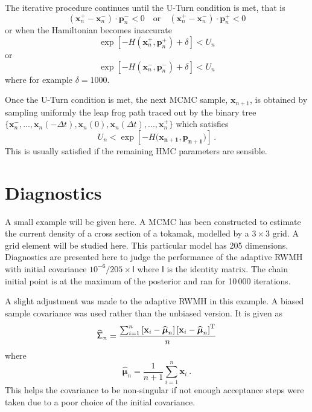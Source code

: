 \documentclass[10pt]{proc}
\newcommand{\T}{^\textup{T}}
\newcommand{\dotdotdot}{...}
\newcommand{\vect}[1]{\mathbf{#1}}
\newcommand{\vectGreek}[1]{\boldsymbol{#1}}
\newcommand{\matr}[1]{\mathsf{#1}}
\begin{document}
The iterative procedure continues until the U-Turn condition is met, that is
\begin{equation}
(\vect{x}_n^+ - \vect{x}_n^-)\cdot \vect{p}_n^- < 0
\quad \text{or} \quad
(\vect{x}_n^+ - \vect{x}_n^-)\cdot \vect{p}_n^+ < 0
\end{equation}
or when the Hamiltonian becomes inaccurate
\begin{equation}
\exp\left[-H(\vect{x}_n^{+},\vect{p}_n^{+})+\delta\right]<U_n
\end{equation}
or
\begin{equation}
\exp\left[-H(\vect{x}_n^{-},\vect{p}_n^{-})+\delta\right]<U_n
\end{equation}
where for example $\delta = 1000$.

Once the U-Turn condition is met, the next MCMC sample, $\vect{x}_{n+1}$, is obtained by sampling uniformly the leap frog path traced out by the binary tree $\{\vect{x}_n^-,\dotdotdot,\vect{x}_n(-\Delta t),\vect{x}_n(0),\vect{x}_n(\Delta t),\dotdotdot,\vect{x}_n^+\}$ which satisfies
\begin{equation}
U_n<\exp\left[-H(\vect{x_{n+1}},\vect{p_{n+1})}\right] \ .
\label{eq:slice}
\end{equation}
This is usually satisfied if the remaining HMC parameters are sensible.

\section{Diagnostics}
A small example will be given here. A MCMC has been constructed to estimate the current density of a cross section of a tokamak, modelled by a $3\times 3$ grid. A grid element will be studied here. This particular model has 205 dimensions. Diagnostics are presented here to judge the performance of the adaptive RWMH with initial covariance $10^{-6}/205 \times \matr{I}$ where $\matr{I}$ is the identity matrix. The chain initial point is at the maximum of the posterior and ran for 10\,000 iterations.

A slight adjustment was made to the adaptive RWMH in this example. A biased sample covariance was used rather than the unbiased version. It is given as
\begin{equation}
\widehat{\matr{\Sigma}}_n=\dfrac{\sum_{i=1}^n\left[\vect{x}_i-\widehat{\vectGreek{\mu}}_n\right]\left[\vect{x}_i-\widehat{\vectGreek{\mu}}_n\right]\T}{n}
\end{equation}
where
\begin{equation}
\widehat{\vectGreek{\mu}}_n = \dfrac{1}{n+1}\sum_{i=1}^n \vect{x}_i \ .
\end{equation}
This helps the covariance to be non-singular if not enough acceptance steps were taken due to a poor choice of the initial covariance.
\end{document}
